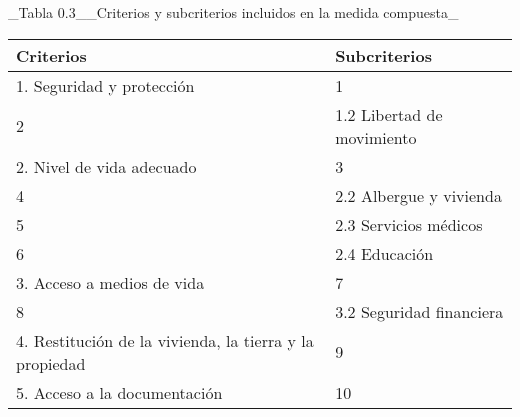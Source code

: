 \documentclass[
]{book}
\begin{document}
\_Tabla 0.3\_\_Criterios y subcriterios incluidos en la medida compuesta\_

\begin{longtable}[]{@{}ll@{}}
\toprule
\textbf{Criterios} & \textbf{Subcriterios} \\
\midrule
\endhead
1. Seguridad y protección & 1 \\
2 & 1.2 Libertad de movimiento \\
2. Nivel de vida adecuado & 3 \\
4 & 2.2 Albergue y vivienda \\
5 & 2.3 Servicios médicos \\
6 & 2.4 Educación \\
3. Acceso a medios de vida & 7 \\
8 & 3.2 Seguridad financiera \\
4. Restitución de la vivienda, la tierra y la propiedad & 9 \\
5. Acceso a la documentación & 10 \\
\bottomrule
\end{longtable}
\end{document}
